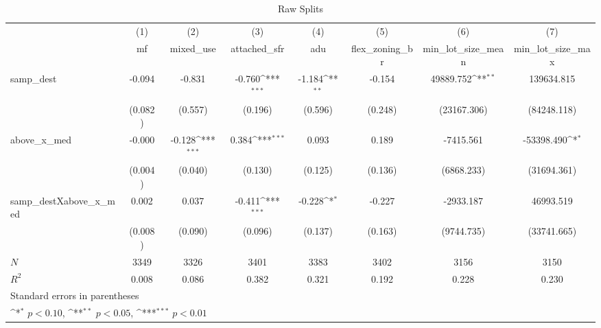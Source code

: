 \begin{table}[htbp]\centering
\def\sym#1{\ifmmode^{#1}\else\(^{#1}\)\fi}
\caption{Raw Splits}
\begin{tabular}{l*{7}{c}}
\hline\hline
            &\multicolumn{1}{c}{(1)}&\multicolumn{1}{c}{(2)}&\multicolumn{1}{c}{(3)}&\multicolumn{1}{c}{(4)}&\multicolumn{1}{c}{(5)}&\multicolumn{1}{c}{(6)}&\multicolumn{1}{c}{(7)}\\
            &\multicolumn{1}{c}{mf}&\multicolumn{1}{c}{mixed\_use}&\multicolumn{1}{c}{attached\_sfr}&\multicolumn{1}{c}{adu}&\multicolumn{1}{c}{flex\_zoning\_br}&\multicolumn{1}{c}{min\_lot\_size\_mean}&\multicolumn{1}{c}{min\_lot\_size\_max}\\
\hline
samp\_dest   &      -0.094         &      -0.831         &      -0.760\sym{***}&      -1.184\sym{**} &      -0.154         &   49889.752\sym{**} &  139634.815         \\
            &     (0.082)         &     (0.557)         &     (0.196)         &     (0.596)         &     (0.248)         & (23167.306)         & (84248.118)         \\
[1em]
above\_x\_med &      -0.000         &      -0.128\sym{***}&       0.384\sym{***}&       0.093         &       0.189         &   -7415.561         &  -53398.490\sym{*}  \\
            &     (0.004)         &     (0.040)         &     (0.130)         &     (0.125)         &     (0.136)         &  (6868.233)         & (31694.361)         \\
[1em]
samp\_destXabove\_x\_med&       0.002         &       0.037         &      -0.411\sym{***}&      -0.228\sym{*}  &      -0.227         &   -2933.187         &   46993.519         \\
            &     (0.008)         &     (0.090)         &     (0.096)         &     (0.137)         &     (0.163)         &  (9744.735)         & (33741.665)         \\
\hline
\(N\)       &        3349         &        3326         &        3401         &        3383         &        3402         &        3156         &        3150         \\
\(R^{2}\)   &       0.008         &       0.086         &       0.382         &       0.321         &       0.192         &       0.228         &       0.230         \\
\hline\hline
\multicolumn{8}{l}{\footnotesize Standard errors in parentheses}\\
\multicolumn{8}{l}{\footnotesize \sym{*} \(p<0.10\), \sym{**} \(p<0.05\), \sym{***} \(p<0.01\)}\\
\end{tabular}
\end{table}
